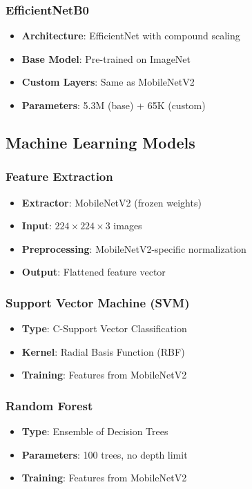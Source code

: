 \documentclass[11pt,a4paper]{article}
\begin{document}
\subsubsection{EfficientNetB0}
\begin{itemize}
    \item \textbf{Architecture}: EfficientNet with compound scaling
    \item \textbf{Base Model}: Pre-trained on ImageNet
    \item \textbf{Custom Layers}: Same as MobileNetV2
    \item \textbf{Parameters}: 5.3M (base) + 65K (custom)
\end{itemize}

\subsection{Machine Learning Models}

\subsubsection{Feature Extraction}
\begin{itemize}
    \item \textbf{Extractor}: MobileNetV2 (frozen weights)
    \item \textbf{Input}: $224 \times 224 \times 3$ images
    \item \textbf{Preprocessing}: MobileNetV2-specific normalization
    \item \textbf{Output}: Flattened feature vector
\end{itemize}

\subsubsection{Support Vector Machine (SVM)}
\begin{itemize}
    \item \textbf{Type}: C-Support Vector Classification
    \item \textbf{Kernel}: Radial Basis Function (RBF)
    \item \textbf{Training}: Features from MobileNetV2
\end{itemize}

\subsubsection{Random Forest}
\begin{itemize}
    \item \textbf{Type}: Ensemble of Decision Trees
    \item \textbf{Parameters}: 100 trees, no depth limit
    \item \textbf{Training}: Features from MobileNetV2
\end{itemize}
\end{document}
